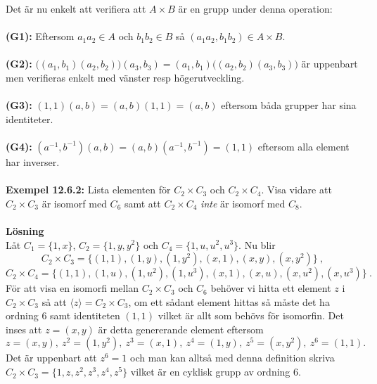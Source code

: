 \documentclass{article}
\begin{document}
Det är nu enkelt att verifiera att $A\times B$ är en grupp under denna operation:\\ \\ 
\textbf{(G1):} Eftersom $a_1a_2\in A$ och $b_1b_2\in B$ så $(a_1a_2,b_1b_2)\in A\times B$.\\ \\ 
\textbf{(G2):} $\big((a_1,b_1)(a_2,b_2)\big)(a_3,b_3)=(a_1,b_1)\big((a_2,b_2)(a_3,b_3)\big)$ är uppenbart men verifieras enkelt med vänster resp högerutveckling.\\ \\ 
\textbf{(G3):} $(1,1)(a,b)=(a,b)(1,1)=(a,b)$ eftersom båda grupper har sina identiteter.\\ \\ 
\textbf{(G4):} $(a^{-1},b^{-1})(a,b)=(a,b)(a^{-1},b^{-1})=(1,1)$ eftersom alla element har inverser.\\ \\ 
\textbf{Exempel 12.6.2:} Lista elementen för $C_2\times C_3$ och $C_2\times C_4$. Visa vidare att $C_2\times C_3$ är isomorf med $C_6$ samt att $C_2\times C_4$ \textit{inte} är isomorf med $C_8$.\\ \\
\textbf{Lösning}\\ 
Låt $C_1=\{1,x\}$, $C_2=\{1,y,y^2\}$ och $C_4=\{1,u,u^2,u^3\}$. Nu blir
$$
C_2\times C_3=\big\{(1,1),(1,y),(1,y^2),(x,1),(x,y),(x,y^2)\big\} \ ,
$$
$$
C_2\times C_4=\big\{(1,1),(1,u),(1,u^2),(1,u^3),(x,1),(x,u),(x,u^2),(x,u^3)\big\} \ .
$$
För att visa en isomorfi mellan $C_2\times C_3$ och $C_6$ behöver vi hitta ett element $z$ i $C_2\times C_3$ så att $\langle z\rangle=C_2\times C_3$, om ett sådant element hittas så måste det ha ordning 6 samt identiteten $(1,1)$ vilket är allt som behövs för isomorfin. Det inses att $z=(x,y)$ är detta genererande element eftersom
$$
z=(x,y), \ z^2=(1,y^2), \ z^3=(x,1), \ z^4=(1,y), \ z^5=(x,y^2), \ z^6=(1,1).
$$
Det är uppenbart att $z^6=1$ och man kan alltså med denna definition skriva $C_2\times C_3=\{1,z,z^2,z^3,z^4,z^5\}$ vilket är en cyklisk grupp av ordning 6.
\end{document}
